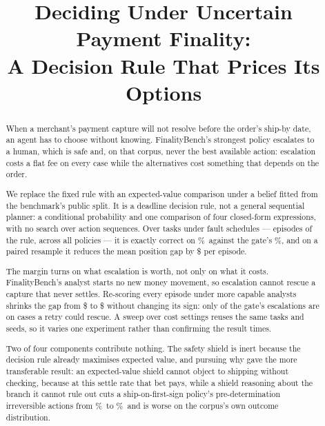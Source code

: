 \documentclass[conference]{IEEEtran}
\begin{document}
\title{Deciding Under Uncertain Payment Finality:\\A Decision Rule That Prices Its Options}

\author{
}

\maketitle

\begin{abstract}
When a merchant's payment capture will not resolve before the order's ship-by
date, an agent has to choose without knowing. FinalityBench's strongest policy
escalates to a human, which is safe and, on that corpus, never the best
available action: escalation costs a flat fee on every case while the
alternatives cost something that depends on the order.

We replace the fixed rule with an expected-value comparison under a belief
fitted from the benchmark's public split. It is a deadline decision rule, not a
general sequential planner: a conditional probability and one comparison of
four closed-form expressions, with no search over action sequences. Over
\nTasks{} tasks under \nSeeds{} fault schedules --- \nRuleEpisodes{} episodes
of the rule, \nGrades{} across all \nPolicies{} policies --- it is exactly
correct on \planExact\%\ against the gate's \gateExact\%,
and on a paired resample it reduces the mean position gap by
\$\vsGateReduction{} per episode.

The margin turns on what escalation is worth, not only on what it costs.
FinalityBench's analyst starts no new money movement, so escalation cannot
rescue a capture that never settles. Re-scoring every episode under more
capable analysts shrinks the gap from \$\escBaselineGap{} to \$\escFullGap{}
without changing its sign: only \escRescuable{} of the gate's
\escEscalations{} escalations are on cases a retry could rescue. A sweep over
\costSettings{} cost settings reuses the same tasks and seeds, so it varies one
experiment rather than confirming the result \costSettings{} times.

Two of four components contribute nothing. The safety shield is inert because
the decision rule already maximises expected value, and pursuing why gave the
more transferable result: an expected-value shield cannot object to shipping
without checking, because at this settle rate that bet pays, while a shield
reasoning about the branch it cannot rule out cuts a ship-on-first-sign
policy's pre-determination irreversible actions from \optPrem\%\ to
\optShieldPrem\%\ and is worse on the corpus's own outcome distribution.
\end{abstract}
\end{document}

